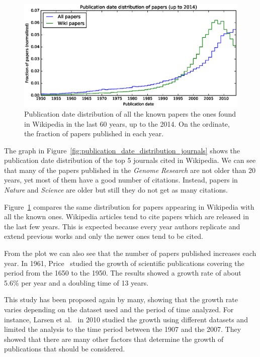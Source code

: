 \begin{figure}[h]
\centering
\includegraphics[keepaspectratio=true, width=\textwidth]{assets/publication_date_pdf}
\caption{Publication date distribution of all the known papers the ones found in Wikipedia in the last 60 years, up to the 2014.
On the ordinate, the fraction of papers published in each year.
}
\label{fig:publication_date_pdf}
\end{figure}

The graph in Figure~\ref{fig:publication_date_distribution_journals} shows the publication date distribution of the top 5 journals cited in Wikipedia.
We can see that many of the papers published in the \emph{Genome Research} are not older than 20 years, yet most of them have a good number of citations.
Instead, papers in \emph{Nature} and \emph{Science} are older but still they do not get as many citations.

Figure~\ref{fig:publication_date_pdf} compares the same distribution for papers appearing in Wikipedia with all the known ones.
Wikipedia articles tend to cite papers which are released in the last few years.
This is expected because every year authors replicate and extend previous works and only the newer ones tend to be cited.

From the plot we can also see that the number of papers published increases each year.
In 1961, Price~\cite{Price1961} studied the growth of scientific publications covering the period from the 1650 to the 1950.
The results showed a growth rate of about 5.6\% per year and a doubling time of 13 years.

This study has been proposed again by many, showing that the growth rate varies depending on the dataset used and the period of time analyzed.
For instance, Larsen et al.~\cite{Larsen2010} in 2010 studied the growth using different datasets and limited the analysis to the time period between the 1907 and the 2007.
They showed that there are many other factors that determine the growth of publications that should be considered.

